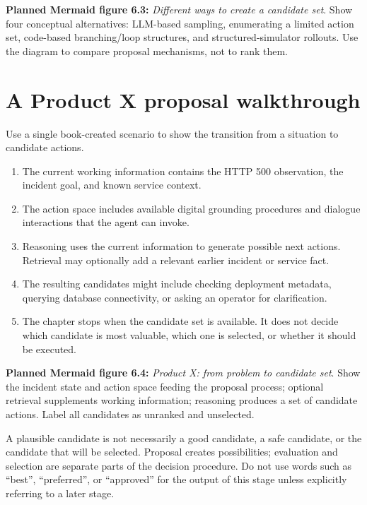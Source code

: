 \textbf{Planned Mermaid figure 6.3:} \emph{Different ways to create a candidate set}. Show four conceptual alternatives: LLM-based sampling, enumerating a limited action set, code-based branching/loop structures, and structured-simulator rollouts. Use the diagram to compare proposal mechanisms, not to rank them.


\section{A Product X proposal walkthrough}
Use a single book-created scenario to show the transition from a situation to candidate actions.
\begin{enumerate}
  \item The current working information contains the HTTP 500 observation, the incident goal, and known service context.
  \item The action space includes available digital grounding procedures and dialogue interactions that the agent can invoke.
  \item Reasoning uses the current information to generate possible next actions. Retrieval may optionally add a relevant earlier incident or service fact.
  \item The resulting candidates might include checking deployment metadata, querying database connectivity, or asking an operator for clarification.
  \item The chapter stops when the candidate set is available. It does not decide which candidate is most valuable, which one is selected, or whether it should be executed.
\end{enumerate}

\textbf{Planned Mermaid figure 6.4:} \emph{Product X: from problem to candidate set}. Show the incident state and action space feeding the proposal process; optional retrieval supplements working information; reasoning produces a set of candidate actions. Label all candidates as unranked and unselected.

\begin{warningbox}
A plausible candidate is not necessarily a good candidate, a safe candidate, or the candidate that will be selected. Proposal creates possibilities; evaluation and selection are separate parts of the decision procedure. Do not use words such as ``best'', ``preferred'', or ``approved'' for the output of this stage unless explicitly referring to a later stage.
\end{warningbox}


